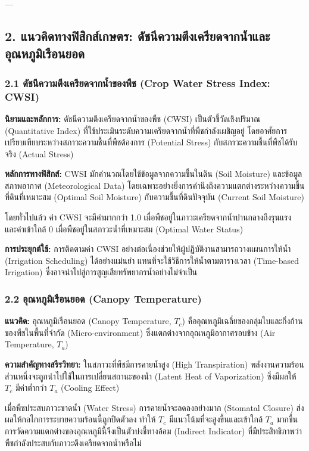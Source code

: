 \documentclass[11pt,a4paper,openany]{report}
\begin{document}
---

\subsection{2. แนวคิดทางฟิสิกส์เกษตร: ดัชนีความตึงเครียดจากน้ำและอุณหภูมิเรือนยอด}


\subsubsection{2.1 ดัชนีความตึงเครียดจากน้ำของพืช (Crop Water Stress Index: CWSI)}


\textbf{นิยามและหลักการ:}
ดัชนีความตึงเครียดจากน้ำของพืช (CWSI) เป็นตัวชี้วัดเชิงปริมาณ (Quantitative Index) ที่ใช้ประเมินระดับความเครียดจากน้ำที่พืชกำลังเผชิญอยู่ โดยอาศัยการเปรียบเทียบระหว่างสภาวะความชื้นที่พืชต้องการ (Potential Stress) กับสภาวะความชื้นที่พืชได้รับจริง (Actual Stress)

\textbf{หลักการทางฟิสิกส์:}
CWSI มักคำนวณโดยใช้ข้อมูลจากความชื้นในดิน (Soil Moisture) และข้อมูลสภาพอากาศ (Meteorological Data) โดยเฉพาะอย่างยิ่งการคำนึงถึงความแตกต่างระหว่างความชื้นที่ดินที่เหมาะสม (Optimal Soil Moisture) กับความชื้นที่ดินปัจจุบัน (Current Soil Moisture)

โดยทั่วไปแล้ว ค่า CWSI จะมีค่ามากกว่า 1.0 เมื่อพืชอยู่ในภาวะเครียดจากน้ำปานกลางถึงรุนแรง และค่าเข้าใกล้ 0 เมื่อพืชอยู่ในสภาวะน้ำที่เหมาะสม (Optimal Water Status)

\textbf{การประยุกต์ใช้:}
การติดตามค่า CWSI อย่างต่อเนื่องช่วยให้ผู้ปฏิบัติงานสามารถวางแผนการให้น้ำ (Irrigation Scheduling) ได้อย่างแม่นยำ แทนที่จะใช้วิธีการให้น้ำตามตารางเวลา (Time-based Irrigation) ซึ่งอาจนำไปสู่การสูญเสียทรัพยากรน้ำอย่างไม่จำเป็น

\subsubsection{2.2 อุณหภูมิเรือนยอด (Canopy Temperature)}


\textbf{แนวคิด:}
อุณหภูมิเรือนยอด (Canopy Temperature, $T_c$) คืออุณหภูมิเฉลี่ยของกลุ่มใบและกิ่งก้านของพืชในพื้นที่จำกัด (Micro-environment) ซึ่งแตกต่างจากอุณหภูมิอากาศรอบข้าง (Air Temperature, $T_a$)

\textbf{ความสำคัญทางสรีรวิทยา:}
ในสภาวะที่พืชมีการคายน้ำสูง (High Transpiration) พลังงานความร้อนส่วนหนึ่งจะถูกนำไปใช้ในการเปลี่ยนสถานะของน้ำ (Latent Heat of Vaporization) ซึ่งมีผลให้ $T_c$ มีค่าต่ำกว่า $T_a$ (Cooling Effect)

เมื่อพืชประสบภาวะขาดน้ำ (Water Stress) การคายน้ำจะลดลงอย่างมาก (Stomatal Closure) ส่งผลให้กลไกการระบายความร้อนนี้ถูกปิดตัวลง ทำให้ $T_c$ มีแนวโน้มที่จะสูงขึ้นและเข้าใกล้ $T_a$ มากขึ้น การวัดความแตกต่างของอุณหภูมินี้จึงเป็นตัวบ่งชี้ทางอ้อม (Indirect Indicator) ที่มีประสิทธิภาพว่าพืชกำลังประสบกับภาวะตึงเครียดจากน้ำหรือไม่
\end{document}
